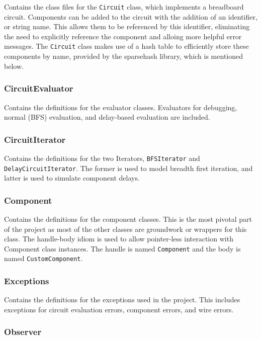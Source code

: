 \documentclass{article}
\newcommand{\ClassName}[1]{\texttt{#1}}
\begin{document}
Contains the class files for the \ClassName{Circuit} class, which implements a breadboard circuit. Components can be added to the circuit with the addition of an identifier, or string name. This allows them to be referenced by this identifier, eliminating the need to explicitly reference the component and alloing more helpful error messages. The \ClassName{Circuit} class makes use of a hash table to efficiently store these components by name, provided by the sparsehash library, which is mentioned below.

\subsubsection{CircuitEvaluator}

Contains the definitions for the evaluator classes. Evaluators for debugging, normal (BFS) evaluation, and delay-based evaluation are included.

\subsubsection{CircuitIterator}

Contains the definitions for the two Iterators, \ClassName{BFSIterator} and \ClassName{DelayCircuitIterator}. The former is used to model breadth first iteration, and latter is used to simulate component delays.

\subsubsection{Component}

Contains the definitions for the component classes. This is the most pivotal part of the project as most of the other classes are groundwork or wrappers for this class. The handle-body idiom is used to allow pointer-less interaction with Component class instances. The handle is named \ClassName{Component} and the body is named \ClassName{CustomComponent}.

\subsubsection{Exceptions}

Contains the definitions for the exceptions used in the project. This includes exceptions for circuit evaluation errors, component errors, and wire errors.

\subsubsection{Observer}
\end{document}
